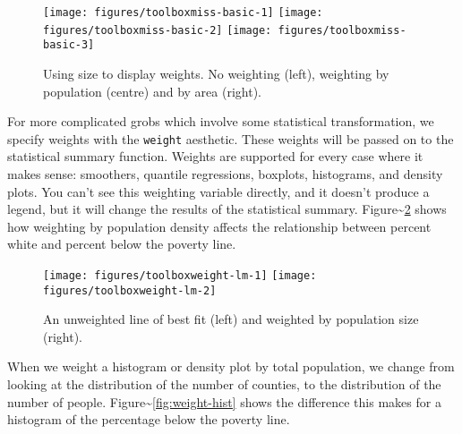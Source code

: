 \begin{figure}
\texttt{[image: figures/toolboxmiss-basic-1]} \texttt{[image: figures/toolboxmiss-basic-2]} \texttt{[image: figures/toolboxmiss-basic-3]} \caption{Using size to display weights. No weighting (left), weighting by population (centre) and by area (right).\label{fig:miss-basic}}
\end{figure}

For more complicated grobs which involve some statistical
transformation, we specify weights with the \texttt{weight} aesthetic.
These weights will be passed on to the statistical summary function.
Weights are supported for every case where it makes sense: smoothers,
quantile regressions, boxplots, histograms, and density plots. You can't
see this weighting variable directly, and it doesn't produce a legend,
but it will change the results of the statistical summary.
Figure\textasciitilde{}\ref{fig:weight-lm} shows how weighting by
population density affects the relationship between percent white and
percent below the poverty line.

\begin{Shaded}
\begin{Highlighting}[]
\StringTok{ }\NormalTok{(}  \NormalTok{)}
 \StringTok{ }
 
    \StringTok{ }
\end{Highlighting}
\end{Shaded}

\begin{figure}
\texttt{[image: figures/toolboxweight-lm-1]} \texttt{[image: figures/toolboxweight-lm-2]} \caption{An unweighted line of best fit (left) and weighted by population size (right).\label{fig:weight-lm}}
\end{figure}

When we weight a histogram or density plot by total population, we
change from looking at the distribution of the number of counties, to
the distribution of the number of people.
Figure\textasciitilde{}\ref{fig:weight-hist} shows the difference this
makes for a histogram of the percentage below the poverty line.

